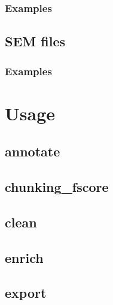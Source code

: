 \documentclass[12pt]{article}
\begin{document}
            \subsubsection{Examples}
            \label{subsubsec:file-vectorised-examples}
            

        \subsection{SEM files}
        \label{subsec:file-sem}
        

            \subsubsection{Examples}
            \label{subsubsec:file-sem-examples}
            
    
    \section{Usage}
    \label{sec:usage}
    

        \subsection{annotate}
        \label{subsec:module-annotate}
        

        \subsection{chunking\_fscore}
        \label{subsec:module-chunking-fscore}
        

        \subsection{clean}
        \label{subsec:module-clean}
        

        \subsection{enrich}
        \label{subsec:module-enrich}
        

        \subsection{export}
        \label{subsec:module-export}
        
\end{document}

